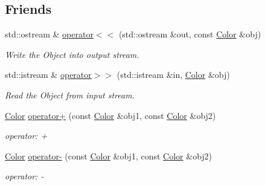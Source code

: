 \subsection*{Friends}
\begin{DoxyCompactItemize}
\item 
std::ostream \& \hyperlink{class_f2_c_1_1_color_ac3b66f04cf3019aab41ef8201e9ded59}{operator$<$$<$} (std::ostream \&out, const \hyperlink{class_f2_c_1_1_color}{Color} \&obj)
\begin{DoxyCompactList}\small\item\em Write the Object into output stream. \item\end{DoxyCompactList}\item 
std::istream \& \hyperlink{class_f2_c_1_1_color_a27da2c3199b5fbb8e2da0891c615a8af}{operator$>$$>$} (std::istream \&in, \hyperlink{class_f2_c_1_1_color}{Color} \&obj)
\begin{DoxyCompactList}\small\item\em Read the Object from input stream. \item\end{DoxyCompactList}\item 
\hypertarget{class_f2_c_1_1_color_af01371c42356255a4e10d6f8b4ba1196}{
\hyperlink{class_f2_c_1_1_color}{Color} \hyperlink{class_f2_c_1_1_color_af01371c42356255a4e10d6f8b4ba1196}{operator+} (const \hyperlink{class_f2_c_1_1_color}{Color} \&obj1, const \hyperlink{class_f2_c_1_1_color}{Color} \&obj2)}
\label{class_f2_c_1_1_color_af01371c42356255a4e10d6f8b4ba1196}

\begin{DoxyCompactList}\small\item\em operator: + \item\end{DoxyCompactList}\item 
\hypertarget{class_f2_c_1_1_color_acbbba898aeb46ba70dff877d9cb3adc7}{
\hyperlink{class_f2_c_1_1_color}{Color} \hyperlink{class_f2_c_1_1_color_acbbba898aeb46ba70dff877d9cb3adc7}{operator-\/} (const \hyperlink{class_f2_c_1_1_color}{Color} \&obj1, const \hyperlink{class_f2_c_1_1_color}{Color} \&obj2)}
\label{class_f2_c_1_1_color_acbbba898aeb46ba70dff877d9cb3adc7}

\begin{DoxyCompactList}\small\item\em operator: -\/ \item\end{DoxyCompactList}\end{DoxyCompactItemize}


